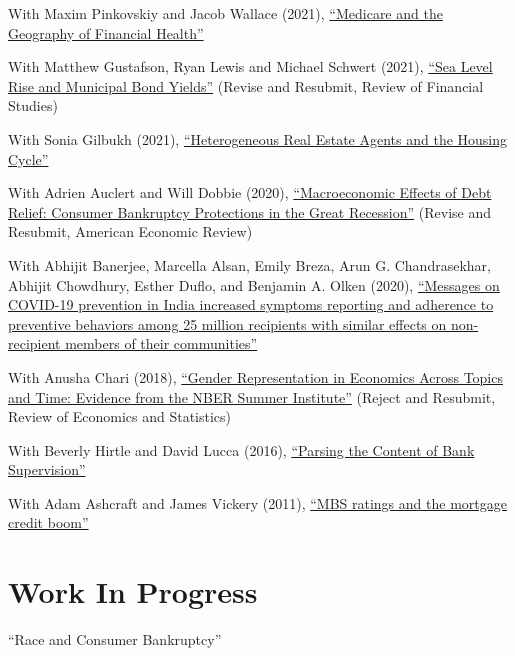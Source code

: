 \documentclass[letterpaper]{article}
\renewenvironment{itemize}{
  \begin{list}{}
    { \setlength{\itemsep}{5pt}
      \setlength{\parsep}{0pt}
      \setlength{\topsep}{0pt}
      \setlength{\leftmargin}{0em} } }{
  \end{list}}
\begin{document}
\begin{itemize}
\item With Maxim Pinkovskiy and Jacob Wallace (2021), \href{http://paulgp.github.io/papers/GPW_compressed.pdf}{``Medicare and the Geography of Financial Health''}
\item With Matthew Gustafson, Ryan Lewis and Michael Schwert (2021), \href{http://paulgp.github.io/papers/ggls_munis.pdf}{``Sea Level Rise and Municipal Bond Yields''} (Revise and Resubmit, Review of Financial Studies)
\item With Sonia Gilbukh (2021), \href{http://paulgp.github.io/papers/Heterogeneous_Real_Estate_Agents_and_the_Housing_Cycle.pdf}{``Heterogeneous Real Estate Agents and the Housing Cycle''} 
\item With Adrien Auclert and Will Dobbie (2020), \href{http://paulgp.github.io/papers/Macroeconomic_Effects_of_Debt_Relief_Posting_342019.pdf}{``Macroeconomic Effects of Debt Relief: Consumer Bankruptcy Protections in the Great Recession''} (Revise and Resubmit, American Economic Review)
\item With  Abhijit Banerjee, Marcella Alsan, Emily Breza, Arun G. Chandrasekhar, Abhijit Chowdhury, Esther Duflo, and Benjamin A. Olken (2020), \href{https://web.stanford.edu/~arungc/BABCCDGO.pdf}{``Messages on COVID-19 prevention in India increased symptoms reporting and adherence to preventive behaviors among 25 million recipients with similar effects on non-recipient members of their communities''}
\item With Anusha Chari (2018), \href{http://paulgp.github.io/papers/cgp_nbergender.pdf}{``Gender Representation in Economics Across Topics and Time: Evidence from the NBER Summer Institute''} (Reject and Resubmit, Review of Economics and Statistics)
\item With Beverly Hirtle and David Lucca (2016), \href{https://www.newyorkfed.org/research/staff_reports/sr770.html}{``Parsing the Content of Bank Supervision''}
\item With Adam Ashcraft and James Vickery (2011), \href{http://papers.ssrn.com/sol3/papers.cfm?abstract_id=1615613}{``MBS ratings and the mortgage credit boom''}
\end{itemize}



\section*{Work In Progress}
\begin{itemize}
\item ``Race and Consumer Bankruptcy'' 
\end{itemize}
\end{document}
